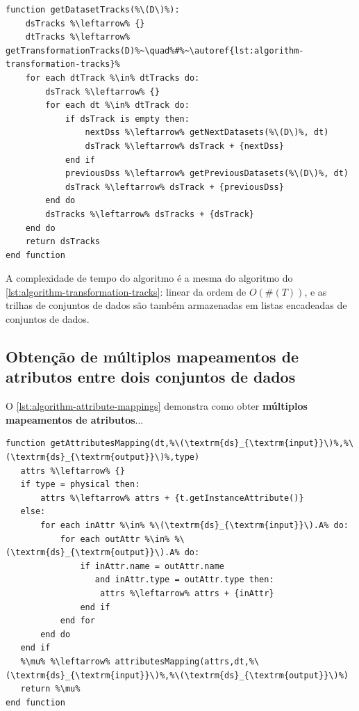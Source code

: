 \begin{minipage}[c]{0.95\textwidth}
\begin{lstlisting}[language=pseudocode,label={lst:algorithm-dataset-tracks},caption={[Detecção das trilhas de conjuntos de dados]Detecção do rastro do fluxo de dados no nível de trilhas de conjuntos de dados.}]
function getDatasetTracks(%\(D\)%):
    dsTracks %\leftarrow% {}
    dtTracks %\leftarrow% getTransformationTracks(D)%~\quad%#%~\autoref{lst:algorithm-transformation-tracks}%
    for each dtTrack %\in% dtTracks do:
        dsTrack %\leftarrow% {}
        for each dt %\in% dtTrack do:
            if dsTrack is empty then:
                nextDss %\leftarrow% getNextDatasets(%\(D\)%, dt)
                dsTrack %\leftarrow% dsTrack + {nextDss}
            end if
            previousDss %\leftarrow% getPreviousDatasets(%\(D\)%, dt)
            dsTrack %\leftarrow% dsTrack + {previousDss}
        end do
        dsTracks %\leftarrow% dsTracks + {dsTrack}
    end do
    return dsTracks
end function
\end{lstlisting}
\end{minipage}

A complexidade de tempo do algoritmo é a mesma do algoritmo do \autoref{lst:algorithm-transformation-tracks}: linear da ordem de \( O(\#(T)) \), e as trilhas de conjuntos de dados são também armazenadas em listas encadeadas de conjuntos de dados.

\subsection{Obtenção de múltiplos mapeamentos de atributos entre dois conjuntos de dados}

O \autoref{lst:algorithm-attribute-mappings} demonstra como obter \textbf{múltiplos mapeamentos de atributos}...


\begin{minipage}[c]{0.95\textwidth}
\begin{lstlisting}[language=pseudocode,label={lst:algorithm-attribute-mappings},caption={[Obtenção de múltiplos mapeamentos de atributos]Obtenção de múltiplos mapeamentos de atributos entre dois conjuntos de dados adjacentes.}]
function getAttributesMapping(dt,%\(\textrm{ds}_{\textrm{input}}\)%,%\(\textrm{ds}_{\textrm{output}}\)%,type)
   attrs %\leftarrow% {}
   if type = physical then:
       attrs %\leftarrow% attrs + {t.getInstanceAttribute()}
   else:
       for each inAttr %\in% %\(\textrm{ds}_{\textrm{input}}\).A% do:
           for each outAttr %\in% %\(\textrm{ds}_{\textrm{output}}\).A% do:
               if inAttr.name = outAttr.name
                  and inAttr.type = outAttr.type then:
                   attrs %\leftarrow% attrs + {inAttr}
               end if
           end for
       end do
   end if
   %\mu% %\leftarrow% attributesMapping(attrs,dt,%\(\textrm{ds}_{\textrm{input}}\)%,%\(\textrm{ds}_{\textrm{output}}\)%)
   return %\mu%
end function
\end{lstlisting}
\end{minipage}

